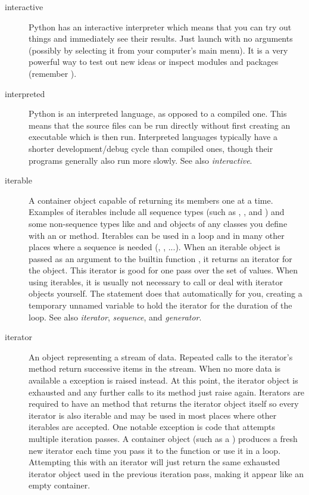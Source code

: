\begin{description}
\item[interactive]
Python has an interactive interpreter which means that you can try out
things and immediately see their results.  Just launch  with no
arguments (possibly by selecting it from your computer's main menu).
It is a very powerful way to test out new ideas or inspect modules and
packages (remember ).

\item[interpreted]
Python is an interpreted language, as opposed to a compiled one.  This means
that the source files can be run directly without first creating an
executable which is then run.  Interpreted languages typically have a
shorter development/debug cycle than compiled ones, though their programs
generally also run more slowly.  See also {}\emph{interactive}.

\item[iterable]
A container object capable of returning its members one at a time.
Examples of iterables include all sequence types (such as ,
{}, and ) and some non-sequence types like
{} and  and objects of any classes you define
with an  or  method.  Iterables
can be used in a  loop and in many other places where a
sequence is needed (, , ...).  When an
iterable object is passed as an argument to the builtin function
{}, it returns an iterator for the object.  This
iterator is good for one pass over the set of values.  When using
iterables, it is usually not necessary to call  or
deal with iterator objects yourself.  The  statement does
that automatically for you, creating a temporary unnamed variable to
hold the iterator for the duration of the loop.  See also
{}\emph{iterator}, \emph{sequence}, and \emph{generator}.

\item[iterator]
An object representing a stream of data.  Repeated calls to the
iterator's  method return successive items in the
stream.  When no more data is available a 
exception is raised instead.  At this point, the iterator object is
exhausted and any further calls to its  method just
raise  again.  Iterators are required to have
an  method that returns the iterator object
itself so every iterator is also iterable and may be used in most
places where other iterables are accepted.  One notable exception is
code that attempts multiple iteration passes.  A container object
(such as a ) produces a fresh new iterator each time you
pass it to the  function or use it in a
{} loop.  Attempting this with an iterator will just
return the same exhausted iterator object used in the previous iteration
pass, making it appear like an empty container.


\end{description}
